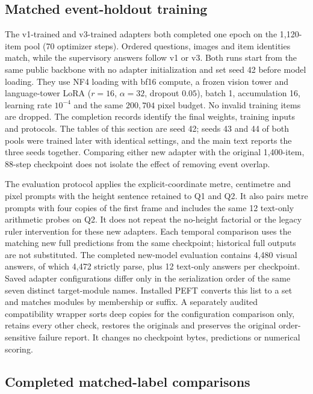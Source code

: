 \documentclass[11pt]{article}
\begin{document}
\subsection{Matched event-holdout training}
\label{app:matched_label_training}

The v1-trained and v3-trained adapters both completed one epoch on the
1,120-item pool (70 optimizer steps). Ordered questions, images and item
identities match, while the supervisory answers follow v1 or v3. Both runs
start from the same public backbone with no adapter initialization and set
seed 42 before model loading. They use NF4 loading with bf16 compute, a
frozen vision tower and language-tower LoRA ($r=16$, $\alpha=32$, dropout
$0.05$), batch 1, accumulation 16, learning rate $10^{-4}$ and the same
$200{,}704$ pixel budget. No invalid training items are dropped.
The completion records identify the final weights, training inputs and
protocols. The tables of this section are seed 42; seeds 43 and 44 of both pools
were trained later with identical settings, and the main text reports the three
seeds together. Comparing either new adapter with the original 1,400-item,
88-step checkpoint does not isolate the effect of removing event overlap.

The evaluation protocol applies the explicit-coordinate metre, centimetre
and pixel prompts with the height sentence retained to Q1 and Q2. It also
pairs metre prompts with four copies of the first frame and includes the
same 12 text-only arithmetic probes on Q2. It does not repeat the no-height
factorial or the legacy ruler intervention for these new adapters.
Each temporal comparison uses the matching new full predictions from
the same checkpoint; historical full outputs are not substituted. The
completed new-model evaluation contains 4,480 visual answers, of which
4,472 strictly parse, plus 12 text-only answers per checkpoint.
Saved adapter configurations differ only in the serialization order of
the same seven distinct target-module names. Installed PEFT converts this
list to a set and matches modules by membership or suffix. A separately
audited compatibility wrapper sorts deep copies for the configuration
comparison only, retains every other check, restores the originals and
preserves the original order-sensitive failure report. It changes no
checkpoint bytes, predictions or numerical scoring.

\subsection{Completed matched-label comparisons}
\label{app:matched_label_results}
\end{document}
